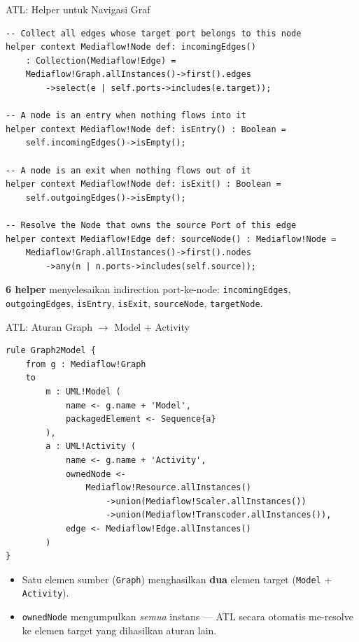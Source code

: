 \documentclass[aspectratio=169, table]{beamer}
\begin{document}
\begin{frame}[fragile]{ATL: Helper untuk Navigasi Graf}
\vspace{4pt}
\begin{lstlisting}[language=atl, basicstyle=\ttfamily\tiny]
-- Collect all edges whose target port belongs to this node
helper context Mediaflow!Node def: incomingEdges()
    : Collection(Mediaflow!Edge) =
    Mediaflow!Graph.allInstances()->first().edges
        ->select(e | self.ports->includes(e.target));

-- A node is an entry when nothing flows into it
helper context Mediaflow!Node def: isEntry() : Boolean =
    self.incomingEdges()->isEmpty();

-- A node is an exit when nothing flows out of it
helper context Mediaflow!Node def: isExit() : Boolean =
    self.outgoingEdges()->isEmpty();

-- Resolve the Node that owns the source Port of this edge
helper context Mediaflow!Edge def: sourceNode() : Mediaflow!Node =
    Mediaflow!Graph.allInstances()->first().nodes
        ->any(n | n.ports->includes(self.source));
\end{lstlisting}

\vspace{4pt}
\small
\textbf{6 helper} menyelesaikan indirection port-ke-node: \texttt{incomingEdges}, \texttt{outgoingEdges}, \texttt{isEntry}, \texttt{isExit}, \texttt{sourceNode}, \texttt{targetNode}.
\end{frame}

\begin{frame}[fragile]{ATL: Aturan Graph $\rightarrow$ Model + Activity}
\vspace{4pt}
\begin{lstlisting}[language=atl, basicstyle=\ttfamily\tiny]
rule Graph2Model {
    from g : Mediaflow!Graph
    to
        m : UML!Model (
            name <- g.name + 'Model',
            packagedElement <- Sequence{a}
        ),
        a : UML!Activity (
            name <- g.name + 'Activity',
            ownedNode <-
                Mediaflow!Resource.allInstances()
                    ->union(Mediaflow!Scaler.allInstances())
                    ->union(Mediaflow!Transcoder.allInstances()),
            edge <- Mediaflow!Edge.allInstances()
        )
}
\end{lstlisting}

\vspace{4pt}
\small
\begin{itemize}
  \item Satu elemen sumber (\texttt{Graph}) menghasilkan \textbf{dua} elemen target (\texttt{Model} + \texttt{Activity}).
  \item \texttt{ownedNode} mengumpulkan \textit{semua} instans --- ATL secara otomatis me-resolve ke elemen target yang dihasilkan aturan lain.
\end{itemize}
\end{frame}
\end{document}
